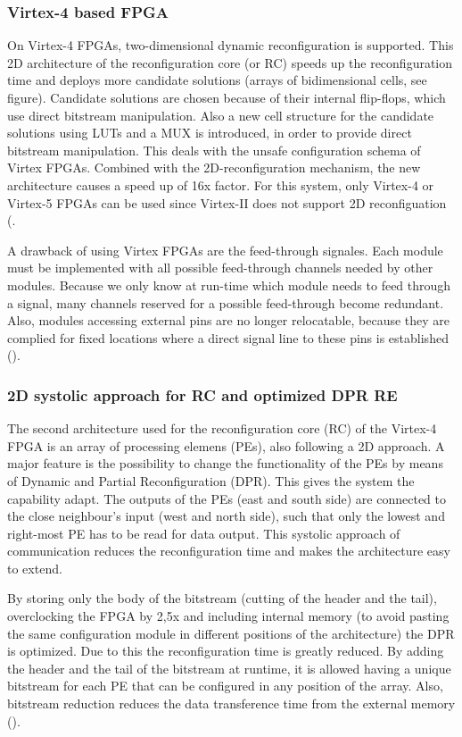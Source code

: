 
\subsubsection{Virtex-4 based FPGA}
On Virtex-4 FPGAs, two-dimensional dynamic reconfiguration is supported. This 2D architecture of the reconfiguration core (or RC) speeds up the reconfiguration time and deploys more candidate solutions (arrays of bidimensional cells, see figure). Candidate solutions are chosen because of their internal flip-flops, which use direct bitstream manipulation. Also a new cell structure for the candidate solutions using LUTs and a MUX is introduced, in order to provide direct bitstream manipulation. This deals with the unsafe configuration schema of Virtex FPGAs. Combined with the 2D-reconfiguration mechanism, the new architecture causes a speed up of 16x factor. For this system, only Virtex-4 or Virtex-5 FPGAs can be used since Virtex-II does not support 2D reconfiguation (\cite{virtex4}.

A drawback of using Virtex FPGAs are the feed-through signales. Each module must be implemented with all possible feed-through channels  needed by other modules. Because we only know at run-time which module needs to feed through a signal, many channels reserved for a possible feed-through become redundant. Also, modules accessing external pins are no longer relocatable, because they are complied for fixed locations where a direct signal line to these pins is established (\cite{erlangen}).


\subsubsection{2D systolic approach for RC and optimized DPR RE}
The second architecture used for the reconfiguration core (RC) of the Virtex-4 FPGA is an array of processing elemens (PEs), also following a 2D approach. A major feature is the possibility to change the functionality of the PEs by means of Dynamic and Partial Reconfiguration (DPR). This gives the system the capability adapt. The outputs of the PEs (east and south side) are connected to the close neighbour's input (west and north side), such that only the lowest and right-most PE has to be read for data output. This systolic approach of communication reduces the reconfiguration time and makes the architecture easy to extend.

By storing only the body of the bitstream (cutting of the header and the tail), overclocking the FPGA by 2,5x and including internal memory (to avoid pasting the same configuration module in different positions of the architecture) the DPR is optimized. Due to this the reconfiguration time is greatly reduced. By adding the header and the tail of the bitstream at runtime, it is allowed having a unique bitstream for each PE that can be configured in any position of the array. Also, bitstream reduction reduces the data transference time from the external memory (\cite{drp}).

